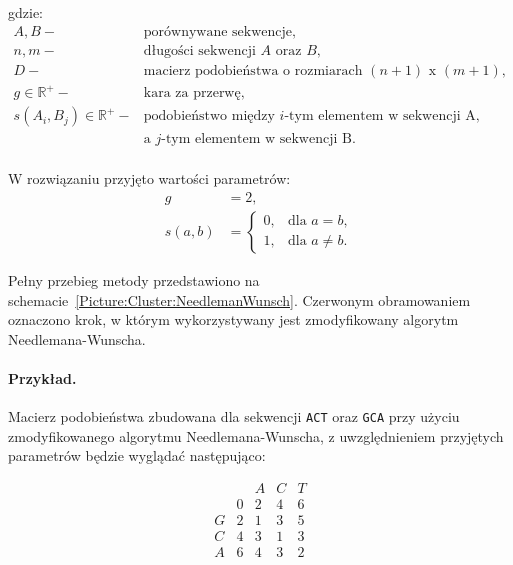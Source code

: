             gdzie:
            \begin{align*} 
                A, B -& \text{porównywane sekwencje}, \\
                n, m -& \text{długości sekwencji } A \text{ oraz } B, \\
                D -& \text{macierz podobieństwa o rozmiarach } (n + 1) \text{ x } (m + 1), \\
                g \in \mathbb{R}^{+} -& \text{kara za przerwę}, \\
                s(A_i, B_j) \in \mathbb{R}^{+} -& \text{podobieństwo między  } i\text{-tym elementem w sekwencji A,} \\ 
                & \text{a } j \text{-tym elementem w sekwencji B}. \\
            \end{align*}

            W rozwiązaniu przyjęto wartości parametrów:
            \begin{align*}
                g &= 2, \\
                s(a, b) &= \begin{cases}
                    0, & \text{dla } a = b, \\
                    1, & \text{dla } a \neq b.
                \end{cases}
            \end{align*}

            Pełny przebieg metody przedstawiono na schemacie~\ref{Picture:Cluster:NeedlemanWunsch}. Czerwonym obramowaniem oznaczono krok, w którym wykorzystywany jest zmodyfikowany algorytm Needlemana-Wunscha.

            \paragraph{Przykład.} Macierz podobieństwa zbudowana dla sekwencji \texttt{ACT} oraz \texttt{GCA} przy użyciu zmodyfikowanego algorytmu Needlemana-Wunscha, z uwzględnieniem przyjętych parametrów będzie wyglądać następująco:

            \[
                \begin{matrix}
                            &        & A      & C      & T      \\
                            &      0 &      2 &      4 &      6 \\
                     G      &      2 &      1 &      3 &      5 \\
                     C      &      4 &      3 &      1 &      3 \\
                     A      &      6 &      4 &      3 &      2 \\
                \end{matrix}
            \]

